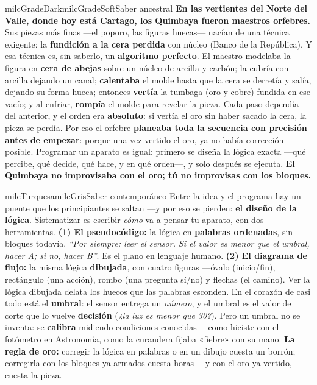 \documentclass[11pt,letterpaper]{article}
\begin{document}
\begin{softbox}{milcGradeDark}{milcGradeSoft}{Saber ancestral}
\textbf{En las vertientes del Norte del Valle, donde hoy está Cartago, los Quimbaya fueron maestros orfebres.} Sus piezas más finas ---el poporo, las figuras huecas--- nacían de una técnica exigente: la \textbf{fundición a la cera perdida} con núcleo (Banco de la República). Y esa técnica es, sin saberlo, un \textbf{algoritmo perfecto}. El maestro modelaba la figura en \textbf{cera de abejas} sobre un núcleo de arcilla y carbón; la cubría con arcilla dejando un canal; \textbf{calentaba} el molde hasta que la cera se derretía y salía, dejando su forma hueca; entonces \textbf{vertía} la tumbaga (oro y cobre) fundida en ese vacío; y al enfriar, \textbf{rompía} el molde para revelar la pieza. Cada paso dependía del anterior, y el orden era \textbf{absoluto}: si vertía el oro sin haber sacado la cera, la pieza se perdía. Por eso el orfebre \textbf{planeaba toda la secuencia con precisión antes de empezar}: porque una vez vertido el oro, ya no había corrección posible. Programar un aparato es igual: primero se diseña la lógica exacta ---qué percibe, qué decide, qué hace, y en qué orden---, y solo después se ejecuta. \textbf{El Quimbaya no improvisaba con el oro; tú no improvisas con los bloques.}
\end{softbox}

\begin{softbox}{milcTurquesa}{milcGris}{Saber contemporáneo}
Entre la idea y el programa hay un puente que los principiantes se saltan ---y por eso se pierden: \textbf{el diseño de la lógica}. Sistematizar es escribir \emph{cómo} va a pensar tu aparato, con dos herramientas. \textbf{(1) El pseudocódigo:} la lógica en \textbf{palabras ordenadas}, sin bloques todavía. \emph{``Por siempre: leer el sensor. Si el valor es menor que el umbral, hacer A; si no, hacer B''}. Es el plano en lenguaje humano. \textbf{(2) El diagrama de flujo:} la misma lógica \textbf{dibujada}, con cuatro figuras ---óvalo (inicio/fin), rectángulo (una acción), rombo (una pregunta sí/no) y flechas (el camino). Ver la lógica dibujada delata los huecos que las palabras esconden. En el corazón de casi todo está el \textbf{umbral}: el sensor entrega un \emph{número}, y el umbral es el valor de corte que lo vuelve \textbf{decisión} (\emph{¿la luz es menor que 30?}). Pero un umbral no se inventa: se \textbf{calibra} midiendo condiciones conocidas ---como hiciste con el fotómetro en Astronomía, como la curandera fijaba «fiebre» con su mano. \textbf{La regla de oro:} corregir la lógica en palabras o en un dibujo cuesta un borrón; corregirla con los bloques ya armados cuesta horas ---y con el oro ya vertido, cuesta la pieza.
\end{softbox}
\end{document}
